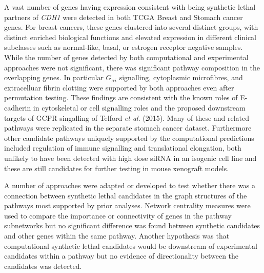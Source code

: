 A vast number of genes having expression consistent with being synthetic lethal partners of \textit{CDH1} were detected in both TCGA Breast and Stomach cancer genes. For breast cancers, these genes clustered into several distinct groups, with distinct enriched biological functions and elevated expression in different clinical subclasses such as normal-like, basal, or estrogen receptor negative samples. While the number of genes detected by both computational and experimental approaches were not significant, there was significant pathway composition in the overlapping genes. In particular $G_{\alpha i}$ signalling, cytoplasmic microfibres, and extracelluar fibrin clotting were supported by both approaches even after permutation testing. These findings are consistent with the known roles of E-cadherin in cytoskeletal or cell signalling roles and the proposed downstream targets of GCPR singalling of Telford \textit{et al}. (2015). Many of these and related pathways were replicated in the separate stomach cancer dataset. Furthermore other candidate pathways uniquely supported by the computational predictions included regulation of immune signalling and translational elongation, both unlikely to have been detected with high dose siRNA in an isogenic cell line and these are still candidates for further testing in mouse xenograft models. 

A number of approaches were adapted or developed to test whether there was a connection between synthetic lethal candidates in the graph structures of the pathways most supported by prior analyses. Network centrality measures were used to compare the importance or connectivity of genes in the pathway subnetworks but no significant difference was found between synthetic candidates and other genes within the same pathway. Another hypothesis was that computational synthetic lethal candidates would be downstream of experimental candidates within a pathway but no evidence of directionality between the candidates was detected. 


